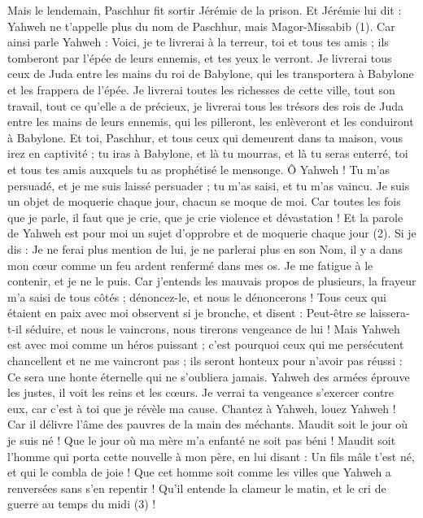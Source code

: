 \begin{multicols}{2}
Mais le lendemain, Paschhur fit sortir Jérémie de la prison. Et Jérémie lui dit : Yahweh ne t’appelle plus du nom de Paschhur, mais Magor-Missabib\FTNT{} (1).
Car ainsi parle Yahweh : Voici, je te livrerai à la terreur, toi et tous tes amis ; ils tomberont par l'épée de leurs ennemis, et tes yeux le verront. Je livrerai tous ceux de Juda entre les mains du roi de Babylone, qui les transportera à Babylone et les frappera de l'épée.
Je livrerai toutes les richesses de cette ville, tout son travail, tout ce qu'elle a de précieux, je livrerai tous les trésors des rois de Juda entre les mains de leurs ennemis, qui les pilleront, les enlèveront et les conduiront à Babylone.
Et toi, Paschhur, et tous ceux qui demeurent dans ta maison, vous irez en captivité ; tu iras à Babylone, et là tu mourras, et là tu seras enterré, toi et tous tes amis auxquels tu as prophétisé le mensonge.
Ô Yahweh ! Tu m'as persuadé, et je me suis laissé persuader ; tu m’as saisi, et tu m’as vaincu. Je suis un objet de moquerie chaque jour, chacun se moque de moi.
Car toutes les fois que je parle, il faut que je crie, que je crie violence et dévastation ! Et la parole de Yahweh est pour moi un sujet d’opprobre et de moquerie chaque jour\FTNT{} (2).
Si je dis : Je ne ferai plus mention de lui, je ne parlerai plus en son Nom, il y a dans mon cœur comme un feu ardent renfermé dans mes os. Je me fatigue à le contenir, et je ne le puis.
Car j'entends les mauvais propos de plusieurs, la frayeur m’a saisi de tous côtés ; dénoncez-le, et nous le dénoncerons ! Tous ceux qui étaient en paix avec moi observent si je bronche, et disent : Peut-être se laissera-t-il séduire, et nous le vaincrons, nous tirerons vengeance de lui !
Mais Yahweh est avec moi comme un héros puissant ; c'est pourquoi ceux qui me persécutent chancellent et ne me vaincront pas ; ils seront honteux pour n’avoir pas réussi : Ce sera une honte éternelle qui ne s'oubliera jamais.
Yahweh des armées éprouve les justes, il voit les reins et les cœurs. Je verrai ta vengeance s’exercer contre eux, car c’est à toi que je révèle ma cause.
Chantez à Yahweh, louez Yahweh ! Car il délivre l'âme des pauvres de la main des méchants.
Maudit soit le jour où je suis né ! Que le jour où ma mère m'a enfanté ne soit pas béni !
Maudit soit l'homme qui porta cette nouvelle à mon père, en lui disant : Un fils mâle t'est né, et qui le combla de joie !
Que cet homme soit comme les villes que Yahweh a renversées sans s'en repentir ! Qu'il entende la clameur le matin, et le cri de guerre au temps du midi\FTNT{} (3) !

\end{multicols}
